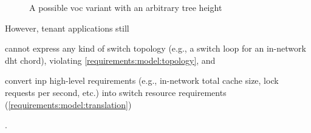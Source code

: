 \begin{figure}[!htb]
    \centering
    \usebox{\vocmodfigure}
    \caption{A possible \gls{voc} variant with an arbitrary tree height}
    \label{fig:vocmod}
\end{figure}

However, tenant applications still
\begin{mylist}
    \item cannot express any kind of switch topology (e.g., a switch loop for an in-network \gls{dht} chord), violating \xmark \ref{requirements:model:topology}, and
    \item convert \gls{inp} high-level requirements (e.g., in-network total cache size, lock requests per second, etc.) into switch resource requirements (\xmark \ref{requirements:model:translation})
\end{mylist}.